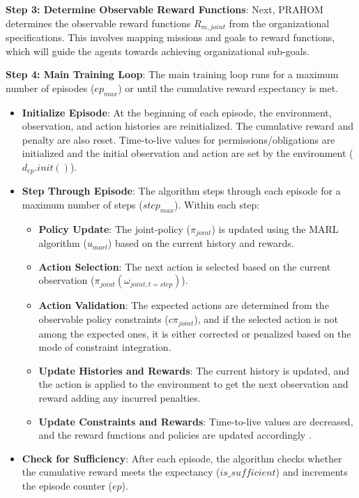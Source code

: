 \documentclass[conference]{IEEEtran}
\begin{document}
\textbf{Step 3: Determine Observable Reward Functions}: \quad
Next, PRAHOM determines the observable reward functions $R_{m,joint}$ from the organizational specifications. This involves mapping missions and goals to reward functions, which will guide the agents towards achieving organizational sub-goals.

\textbf{Step 4: Main Training Loop}: \quad
The main training loop runs for a maximum number of episodes ($ep_{max}$) or until the cumulative reward expectancy is met.

\begin{itemize}
    \item \textbf{Initialize Episode}:
          At the beginning of each episode, the environment, observation, and action histories are reinitialized. The cumulative reward and penalty are also reset. Time-to-live values for permissions/obligations are initialized and the initial observation and action are set by the environment ($d_{ep}.init()$).

    \item \textbf{Step Through Episode}:
          The algorithm steps through each episode for a maximum number of steps ($step_{max}$). Within each step:

          \begin{itemize}
              \item \textbf{Policy Update}:
                    The joint-policy ($\pi_{joint}$) is updated using the MARL algorithm ($u_{marl}$) based on the current history and rewards.

              \item \textbf{Action Selection}:
                    The next action is selected based on the current observation ($\pi_{joint}(\omega_{joint,t=step})$).

              \item \textbf{Action Validation}:
                    The expected actions are determined from the observable policy constraints ($c\pi_{joint}$), and if the selected action is not among the expected ones, it is either corrected or penalized based on the mode of constraint integration.

              \item \textbf{Update Histories and Rewards}:
                    The current history is updated, and the action is applied to the environment to get the next observation and reward adding any incurred penalties.

              \item \textbf{Update Constraints and Rewards}:
                    Time-to-live values are decreased, and the reward functions and policies are updated accordingly .
          \end{itemize}

    \item \textbf{Check for Sufficiency}:
          After each episode, the algorithm checks whether the cumulative reward meets the expectancy ($is\_sufficient$) and increments the episode counter ($ep$).
\end{itemize}
\end{document}
